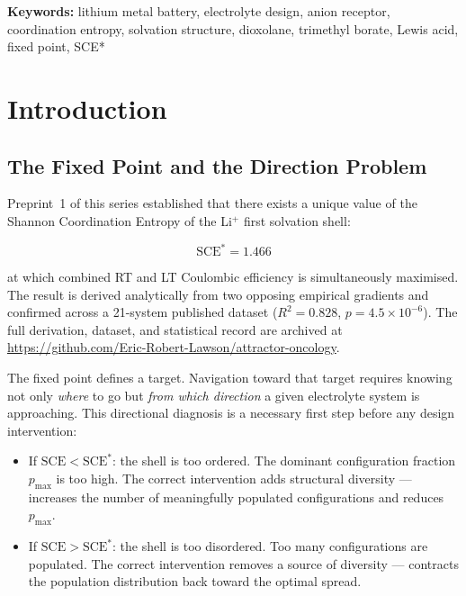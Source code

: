 \documentclass[11pt]{article}
\theoremstyle{plain}
\theoremstyle{definition}
\theoremstyle{remark}
\begin{document}
\vspace{1em}
\noindent\textbf{Keywords:} lithium metal battery, electrolyte design,
anion receptor, coordination entropy, solvation structure, dioxolane,
trimethyl borate, Lewis acid, fixed point, SCE*

\tableofcontents
\newpage

\section{Introduction}

\subsection{The Fixed Point and the Direction Problem}

Preprint~1 of this series established that there exists a unique value
of the Shannon Coordination Entropy of the Li$^+$ first solvation shell:

\begin{equation}
  \mathrm{SCE}^{*} = 1.466
  \label{eq:fixed_point}
\end{equation}

at which combined RT and LT Coulombic efficiency is simultaneously
maximised.  The result is derived analytically from two opposing
empirical gradients and confirmed across a 21-system published dataset
($R^2 = 0.828$, $p = 4.5 \times 10^{-6}$).  The full derivation,
dataset, and statistical record are archived at
\url{https://github.com/Eric-Robert-Lawson/attractor-oncology}.

The fixed point defines a target.  Navigation toward that target requires
knowing not only \emph{where} to go but \emph{from which direction} a
given electrolyte system is approaching.  This directional diagnosis
is a necessary first step before any design intervention:

\begin{itemize}[leftmargin=2em]
  \item If $\mathrm{SCE} < \mathrm{SCE}^{*}$: the shell is too ordered.
        The dominant configuration fraction $p_{\max}$ is too high.
        The correct intervention adds structural diversity --- increases
        the number of meaningfully populated configurations and reduces
        $p_{\max}$.
  \item If $\mathrm{SCE} > \mathrm{SCE}^{*}$: the shell is too disordered.
        Too many configurations are populated.  The correct intervention
        removes a source of diversity --- contracts the population
        distribution back toward the optimal spread.
\end{itemize}
\end{document}

